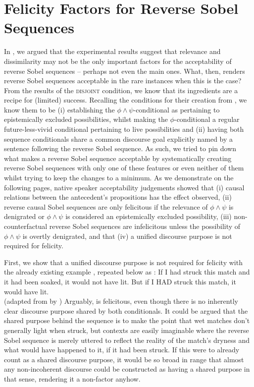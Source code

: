 \section{Felicity Factors for Reverse Sobel Sequences}
In , we argued that the experimental results suggest that relevance and dissimilarity may not be the only important factors for the acceptability of reverse Sobel sequences -- perhaps not even the main ones. What, then, renders reverse Sobel sequences acceptable in the rare instances when this is the case? From the results of the {\scshape disjoint} condition, we know that its ingredients are a recipe for (limited) success. Recalling the conditions for their creation from , we know them to be (i) establishing the $\phi\land\psi$-conditional as pertaining to epistemically excluded possibilities, whilst making the $\phi$-conditional a regular future-less-vivid conditional pertaining to live possibilities and (ii) having both sequence conditionals share a common discourse goal explicitly named by a sentence following the reverse Sobel sequence. As such, we tried to pin down what makes a reverse Sobel sequence acceptable by systematically creating reverse Sobel sequences with only one of these features or even neither of them whilst trying to keep the changes to a minimum. As we demonstrate on the following pages, native speaker acceptability judgements showed that (i) causal relations between the antecedent's propositions has the effect \textcite{Klecha2014} observed, (ii) reverse causal Sobel sequences are only felicitous if the relevance of $\phi\land\psi$ is denigrated or $\phi\land\psi$ is considered an epistemically excluded possibility, (iii) non-counterfactual reverse Sobel sequences are infelicitous unless the possibility of $\phi\land\psi$ is overtly denigrated, and that (iv) a unified discourse purpose is not required for felicity. 

First, we show that a unified discourse purpose is not required for felicity with the already existing example , repeated below as :
\ex{}If I had struck this match and it had been soaked, it would not have lit. But if I \MakeUppercase{had} struck this match, it would have lit.\\%
\emptyfill(adapted from \textcite[p. 106]{Stalnaker1968} by \textcite[p. 487]{Lewis2018})
\xe
Arguably,  is felicitous, even though there is no inherently clear discourse purpose shared by both conditionals. It could be argued that the shared purpose behind the sequence is to make the point that wet matches don't generally light when struck, but contexts are easily imaginable where the reverse Sobel sequence is merely uttered to reflect the reality of the match's dryness and what would have happened to it, if it had been struck. If this were to already count as a shared discourse purpose, it would be so broad in range that almost any non-incoherent discourse could be constructed as having a shared purpose in that sense, rendering it a non-factor anyhow.

